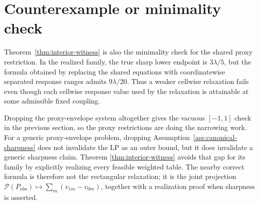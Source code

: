 \documentclass[11pt]{article}
\theoremstyle{definition}
\theoremstyle{plain}
\theoremstyle{remark}
\begin{document}
\section{Counterexample or minimality check}
Theorem~\ref{thm:interior-witness} is also the minimality check for the shared
proxy restriction.  In the realized family, the true sharp lower endpoint is
\(3\lambda/5\), but the formula obtained by replacing the shared equations
with coordinatewise separated response ranges admits \(9\lambda/20\).  Thus a
weaker cellwise relaxation fails even though each cellwise response value used
by the relaxation is attainable at some admissible fixed coupling.

Dropping the proxy-envelope system altogether gives the vacuous
\([-1,1]\) check in the previous section, so the proxy restrictions are doing
the narrowing work.  For a generic proxy-envelope problem, dropping
Assumption~\ref{ass:canonical-sharpness} does not invalidate the LP as an
outer bound, but it does invalidate a generic sharpness claim.  Theorem
\ref{thm:interior-witness} avoids that gap for its family by explicitly
realizing every feasible weighted table.  The nearby correct formula is
therefore not the rectangular relaxation; it is the joint projection
\(\mathcal P(P_{\mathrm{obs}})\mapsto\sum_m(v_{1m}-v_{0m})\), together with a
realization proof when sharpness is asserted.
\end{document}
